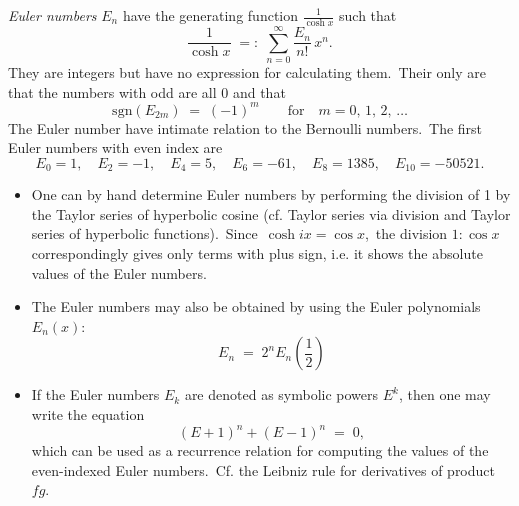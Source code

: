 \documentclass[12pt]{article}
\theoremstyle{definition}
\begin{document}

\emph{Euler numbers} $E_n$ have the generating function $\displaystyle\frac{1}{\cosh{x}}$ such that
$$\frac{1}{\cosh{x}} \;=:\; \sum_{n=0}^\infty\frac{E_n}{n!}\,x^n.$$
They are integers but have no  expression for calculating them.\, Their only  are that the numbers with odd  are all 0 and that 
$$\mbox{sgn}(E_{2m}) \;=\; (-1)^m \qquad \mbox{for} \quad m = 0,\,1,\,2,\,\ldots$$
The Euler number have intimate relation to the Bernoulli numbers.\, The first Euler numbers with even index are
$$E_0 = 1,\quad E_2 = -1,\quad E_4 = 5,\quad E_6 = -61,
\quad E_8 = 1385,\quad E_{10} = -50521.$$

\begin{itemize}

\item One can by hand determine Euler numbers by performing the 
division of 1 by the Taylor series of hyperbolic cosine 
(cf. Taylor series via division and Taylor series of hyperbolic 
functions).\, 
Since\, $\cosh{ix} = \cos{x}$,\, the division $1:\cos{x}$ 
correspondingly gives only terms with plus sign, i.e. it shows the 
absolute values of the Euler numbers.\\

\item The Euler numbers may also be obtained by using the Euler polynomials $E_n(x)$:
$$E_n \;=\; 2^nE_n\!\!\left(\!\frac{1}{2}\!\right)$$

\item If the Euler numbers $E_k$ are denoted as symbolic powers $E^k$, then one may write the equation
$$(E\!+\!1)^n+(E\!-\!1)^n \;=\; 0,$$
which can be used as a recurrence relation for computing the values of the even-indexed Euler numbers.\, Cf. the Leibniz rule for derivatives of product $fg$.

\end{itemize}



\end{document}
